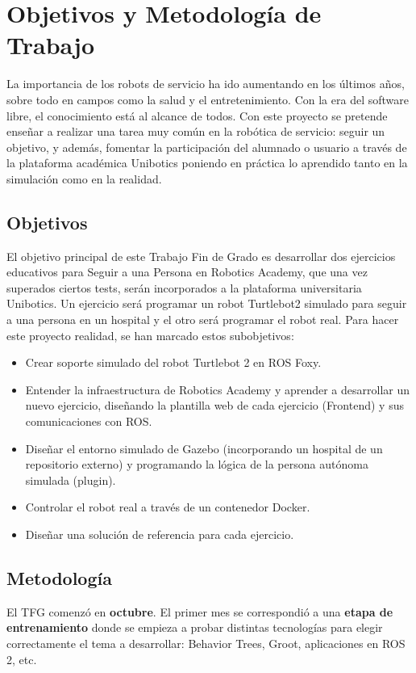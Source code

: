 \chapter{Objetivos y Metodología de Trabajo}
\label{cap:capitulo2}

La importancia de los robots de servicio ha ido aumentando en los últimos años, sobre todo en campos como la salud y el entretenimiento. Con la era del software libre, el conocimiento está al alcance de todos. Con este proyecto se pretende enseñar a realizar una tarea muy común en la robótica de servicio: seguir un objetivo, y además, fomentar la participación del alumnado o usuario a través de la plataforma académica Unibotics poniendo en práctica lo aprendido tanto en la simulación como en la realidad.




\section{Objetivos}
\label{sec:objetivos}
El objetivo principal de este Trabajo Fin de Grado es desarrollar dos ejercicios educativos para Seguir a una Persona en Robotics Academy, que una vez superados ciertos tests, serán incorporados a la plataforma universitaria Unibotics. Un ejercicio será programar un robot Turtlebot2 simulado para seguir a una persona en un hospital y el otro será programar el robot real. Para hacer este proyecto realidad, se han marcado estos subobjetivos:

\begin{itemize}
	\item Crear soporte simulado del robot Turtlebot 2 en ROS Foxy.
	\item Entender la infraestructura de Robotics Academy y aprender a desarrollar un nuevo ejercicio, diseñando la plantilla web de cada ejercicio (Frontend) y sus comunicaciones con ROS.
	\item Diseñar el entorno simulado de Gazebo (incorporando un hospital de un repositorio externo) y programando la lógica de la persona autónoma simulada (plugin).
	\item Controlar el robot real a través de un contenedor Docker.
	\item Diseñar una solución de referencia para cada ejercicio.
\end{itemize}



\section{Metodología}
\label{sec:metodologia}
El TFG comenzó en \textbf{octubre}. El primer mes se correspondió a una \textbf{etapa de entrenamiento} donde se empieza a probar distintas tecnologías para elegir correctamente el tema a desarrollar: Behavior Trees, Groot, aplicaciones en ROS 2, etc.\\

